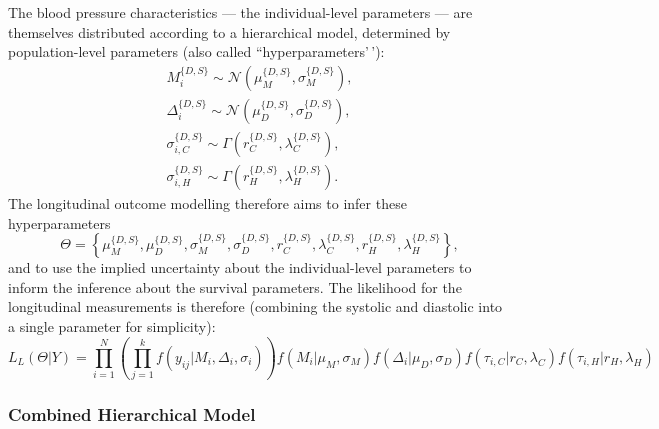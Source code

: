 \documentclass[
]{article}
\begin{document}
The blood pressure characteristics --- the individual-level parameters --- are themselves distributed according to a hierarchical model, determined by population-level parameters (also called ``hyperparameters'\,'):
\begin{equation}\label{priorsL}
\begin{aligned}
  M_i^{\{D,S\}}\sim \mathcal{N}(\mu_M^{\{D,S\}},\sigma_M^{\{D,S\}}),\\
  \Delta_i^{\{D,S\}}\sim \mathcal{N}(\mu_D^{\{D,S\}},\sigma_D^{\{D,S\}}),\\
  \sigma_{i,C}^{\{D,S\}}\sim \Gamma(r_C^{\{D,S\}},\lambda_C^{\{D,S\}}),\\
  \sigma_{i,H}^{\{D,S\}}\sim \Gamma(r_H^{\{D,S\}},\lambda_H^{\{D,S\}}).
\end{aligned}
\end{equation}
The longitudinal outcome modelling therefore aims to infer these hyperparameters
\begin{equation}
  \Theta=\left\{\mu_M^{\{D,S\}},\mu_D^{\{D,S\}},\sigma_M^{\{D,S\}},\sigma_D^{\{D,S\}},r_C^{\{D,S\}},\lambda_C^{\{D,S\}},r_H^{\{D,S\}},\lambda_H^{\{D,S\}}\right\},
\end{equation}
and to use the implied uncertainty about the individual-level parameters to inform the inference about the survival parameters.
The likelihood for the longitudinal measurements is therefore (combining the systolic and diastolic into a single parameter for simplicity):
\begin{equation}\label{likelong}
  L_L(\Theta|Y)=\prod_{i=1}^N\left(\prod_{j=1}^{k}f(y_{ij}|M_i,\Delta_i,\sigma_i)\right)f(M_i|\mu_M,\sigma_M)f(\Delta_i|\mu_D,\sigma_D)f(\tau_{i,C}|r_C,\lambda_C)f(\tau_{i,H}|r_H,\lambda_H)
\end{equation}

\subsubsection{Combined Hierarchical Model}\label{combined-hierarchical-model}
\end{document}
